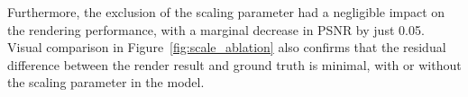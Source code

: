 Furthermore, the exclusion of the scaling parameter had a negligible impact on the rendering performance, with a marginal decrease in PSNR by just 0.05. Visual comparison in Figure~\ref{fig:scale_ablation} also confirms that the residual difference between the render result and ground truth is minimal, with or without the scaling parameter in the model.





